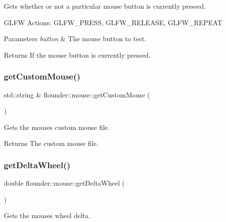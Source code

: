 Gets whether or not a particular mouse button is currently pressed. 

G\+L\+FW Actions\+: G\+L\+F\+W\+\_\+\+P\+R\+E\+SS, G\+L\+F\+W\+\_\+\+R\+E\+L\+E\+A\+SE, G\+L\+F\+W\+\_\+\+R\+E\+P\+E\+AT


\begin{DoxyParams}{Parameters}
{\em button} & The mouse button to test. \\
\hline
\end{DoxyParams}
\begin{DoxyReturn}{Returns}
If the mouse button is currently pressed. 
\end{DoxyReturn}
\mbox{\label{classflounder_1_1mouse_a43d0ec3660e698553e9c1f2f4403718e}} 
\subsubsection{\texorpdfstring{get\+Custom\+Mouse()}{getCustomMouse()}}
{\footnotesize\ttfamily std\+::string \& flounder\+::mouse\+::get\+Custom\+Mouse (\begin{DoxyParamCaption}{ }\end{DoxyParamCaption})}



Gets the mouses custom mouse file. 

\begin{DoxyReturn}{Returns}
The custom mouse file. 
\end{DoxyReturn}
\mbox{\label{classflounder_1_1mouse_aca4c4c0498247db6fafef3ad7fb7a729}} 
\subsubsection{\texorpdfstring{get\+Delta\+Wheel()}{getDeltaWheel()}}
{\footnotesize\ttfamily double flounder\+::mouse\+::get\+Delta\+Wheel (\begin{DoxyParamCaption}{ }\end{DoxyParamCaption})}



Gets the mouses wheel delta. 

